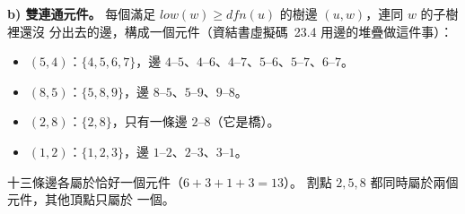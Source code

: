 \begin{pastsoln}
\textbf{b) 雙連通元件。} 每個滿足 $\mathit{low}(w) \ge \mathit{dfn}(u)$ 的樹邊 $(u, w)$，連同 $w$ 的子樹裡還沒
分出去的邊，構成一個元件（資結書虛擬碼~23.4 用邊的堆疊做這件事）：
\begin{itemize}
\item $(5, 4)$：$\{4, 5, 6, 7\}$，邊 $4$--$5$、$4$--$6$、$4$--$7$、$5$--$6$、$5$--$7$、$6$--$7$。
\item $(8, 5)$：$\{5, 8, 9\}$，邊 $8$--$5$、$5$--$9$、$9$--$8$。
\item $(2, 8)$：$\{2, 8\}$，只有一條邊 $2$--$8$（它是橋）。
\item $(1, 2)$：$\{1, 2, 3\}$，邊 $1$--$2$、$2$--$3$、$3$--$1$。
\end{itemize}
十三條邊各屬於恰好一個元件（$6 + 3 + 1 + 3 = 13$）。 割點 $2, 5, 8$ 都同時屬於兩個元件，其他頂點只屬於
一個。
\end{pastsoln}
